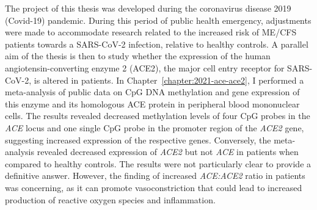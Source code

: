 The project of this thesis was developed during the coronavirus disease 2019 (Covid-19) pandemic. During this period of public health emergency, adjustments were made to accommodate research related to the increased risk of ME/CFS patients towards a SARS-CoV-2 infection, relative to healthy controls. A parallel aim of the thesis is then to study whether the expression of the human angiotensin-converting enzyme 2 (ACE2), the major cell entry receptor for SARS-CoV-2, is altered in patients. In Chapter~\ref{chapter:2021-ace-ace2}, I performed a meta-analysis of public data on CpG DNA methylation and gene expression of this enzyme and its homologous ACE protein in peripheral blood mononuclear cells. The results revealed decreased methylation levels of four CpG probes in the \textit{ACE} locus and one single CpG probe in the promoter region of the \textit{ACE2} gene, suggesting increased expression of the respective genes. Conversely, the meta-analysis revealed decreased expression of \textit{ACE2} but not \textit{ACE} in patients when compared to healthy controls. The results were not particularly clear to provide a definitive answer. However, the finding of increased \textit{ACE:ACE2} ratio in patients was concerning, as it can promote vasoconstriction that could lead to increased production of reactive oxygen species and inflammation.

